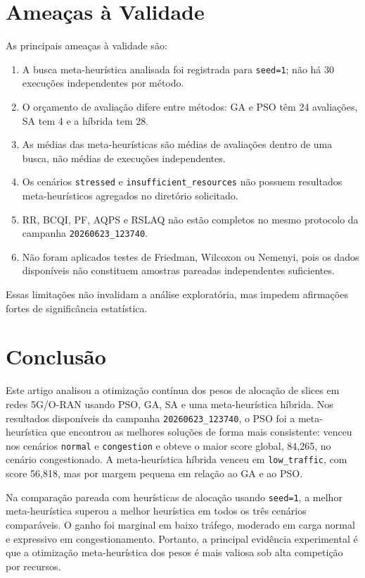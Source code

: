 \documentclass[12pt,a4paper]{article}
\begin{document}
\section{Ameaças à Validade}

As principais ameaças à validade são:

\begin{enumerate}
  \item A busca meta-heurística analisada foi registrada para \texttt{seed=1}; não há 30 execuções independentes por método.
  \item O orçamento de avaliação difere entre métodos: GA e PSO têm 24 avaliações, SA tem 4 e a híbrida tem 28.
  \item As médias das meta-heurísticas são médias de avaliações dentro de uma busca, não médias de execuções independentes.
  \item Os cenários \texttt{stressed} e \texttt{insufficient\_resources} não possuem resultados meta-heurísticos agregados no diretório solicitado.
  \item RR, BCQI, PF, AQPS e RSLAQ não estão completos no mesmo protocolo da campanha \texttt{20260623\_123740}.
  \item Não foram aplicados testes de Friedman, Wilcoxon ou Nemenyi, pois os dados disponíveis não constituem amostras pareadas independentes suficientes.
\end{enumerate}

Essas limitações não invalidam a análise exploratória, mas impedem afirmações fortes de significância estatística.

\section{Conclusão}

Este artigo analisou a otimização contínua dos pesos de alocação de slices em redes 5G/O-RAN usando PSO, GA, SA e uma meta-heurística híbrida. Nos resultados disponíveis da campanha \texttt{20260623\_123740}, o PSO foi a meta-heurística que encontrou as melhores soluções de forma mais consistente: venceu nos cenários \texttt{normal} e \texttt{congestion} e obteve o maior score global, 84,265, no cenário congestionado. A meta-heurística híbrida venceu em \texttt{low\_traffic}, com score 56,818, mas por margem pequena em relação ao GA e ao PSO.

Na comparação pareada com heurísticas de alocação usando \texttt{seed=1}, a melhor meta-heurística superou a melhor heurística em todos os três cenários comparáveis. O ganho foi marginal em baixo tráfego, moderado em carga normal e expressivo em congestionamento. Portanto, a principal evidência experimental é que a otimização meta-heurística dos pesos é mais valiosa sob alta competição por recursos.
\end{document}
